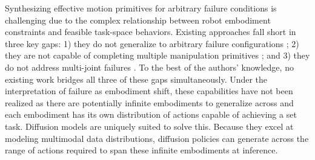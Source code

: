 Synthesizing effective motion primitives for arbitrary failure conditions is challenging due to the complex relationship between robot embodiment constraints and feasible task-space behaviors. Existing approaches fall short in three key gaps: 1) they do not generalize to arbitrary failure configurations \cite{briscoe2024exploring, xie2021maximizing}; 2) they are not capable of completing multiple manipulation primitives \cite{pham2024adaptive}; and 3) they do not address multi-joint failures \cite{mu2016kinematic, kim2024quadrupedal}. To the best of the authors’ knowledge, no existing work bridges all three of these gaps simultaneously. 
Under the interpretation of failure as embodiment shift, these capabilities have not been realized as there are potentially infinite embodiments to generalize across and each embodiment has its own distribution of actions capable of achieving a set task. 
Diffusion models are uniquely suited to solve this. Because they excel at modeling multimodal data distributions, diffusion policies can generate across the range of actions required to span these infinite embodiments at inference.

